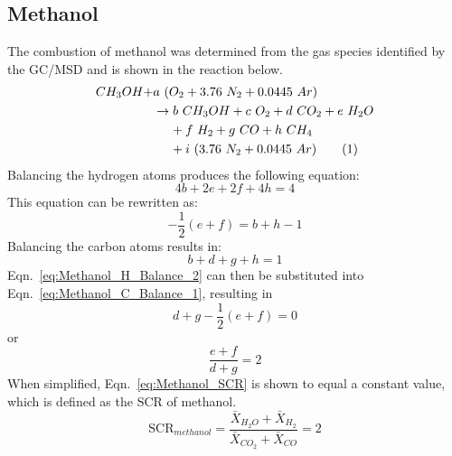 \documentclass[12pt]{article}
\newcommand\numberthis{\addtocounter{equation}{1}\tag{\theequation}}
\begin{document}
\subsection{Methanol}
\label{ssec:Methanol_SCR}
The combustion of methanol was determined from the gas species identified by the GC/MSD and is shown in the reaction below.
\begin{align*}
CH_{3}OH+&a~(O_{2}+3.76~N_{2}+0.0445~Ar)\\
&\rightarrow b~CH_{3}OH+c~O_{2}+ d~CO_{2}+e~H_{2}O\\
&~~~~+f~H_{2}+ g~CO+h~CH_{4}\\
&~~~~+i~(3.76~N_{2}+0.0445~Ar) \numberthis \label{eq:Methanol_rxn}
\end{align*}
Balancing the hydrogen atoms produces the following equation:
\begin{equation}
\label{eq:Methanol_H_Balance_1}
4b+2e+2f+4h=4
\end{equation}
This equation can be rewritten as:
\begin{equation}
\label{eq:Methanol_H_Balance_2}
-\frac{1}{2}\left(e+f\right)=b+h-1
\end{equation}
Balancing the carbon atoms results in:
\begin{equation}
\label{eq:Methanol_C_Balance_1}
b+d+g+h=1
\end{equation}
Eqn.~\ref{eq:Methanol_H_Balance_2} can then be substituted into Eqn.~\ref{eq:Methanol_C_Balance_1}, resulting in
\begin{equation}
\label{eq:Methanol_C_Balance_2}
d+g-\frac{1}{2}\left(e+f\right)=0
\end{equation}
or
\begin{equation}
\label{eq:Methanol_SCR}
\frac{e+f}{d+g}=2
\end{equation}
When simplified, Eqn.~\ref{eq:Methanol_SCR} is shown to equal a constant value, which is defined as the $\text{SCR}$ of methanol.
\begin{equation}\label{eq:prod_ratio_methanol}
 \text{SCR}_{methanol}=\frac{\bar{X}_{H_2O}+\bar{X}_{H_2}}{\bar{X}_{CO_2}+\bar{X}_{CO}}=2
\end{equation}

\pagebreak
\end{document}
